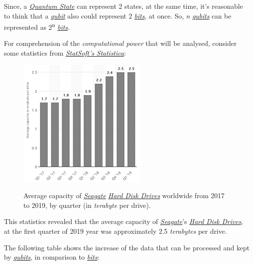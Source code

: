 \documentclass[conference]{IEEEtran}
\begin{document}
Since, a \href{https://en.wikipedia.org/wiki/Quantum_state}{\textit{Quantum State}} can represent 2 states, at the same time, it's reasonable to think that a \href{https://en.wikipedia.org/wiki/Qubit}{\textit{qubit}} also could represent 2 \href{https://en.wikipedia.org/wiki/Bit}{\textit{bits}}, at once. So, \textit{n \href{https://en.wikipedia.org/wiki/Qubit}{qubits}} can be represented as 2\textsuperscript{n} \href{https://en.wikipedia.org/wiki/Bit}{\textit{bits}}.

\vspace{4pt}

For comprehension of the \textit{computational power} that will be analysed, consider some statistics from \href{http://www.statsoft.com/Products/STATISTICA-Features}{\textit{StatSoft's Statistica}}:

\begin{figure}[htbp]
\centerline{\href{https://www.statista.com/statistics/795748/worldwide-seagate-average-hard-disk-drive-capacity/}{\includegraphics{imgs/fig-8.png}}}
\caption{Average capacity of \href{https://www.seagate.com/}{\textit{Seagate}} \href{https://en.wikipedia.org/wiki/Hard_disk_drive}{\textit{Hard Disk Drives}} worldwide from 2017 to 2019, by quarter (in \textit{terabyte} per drive).}
\label{fig}
\end{figure}

This statistics revealed that the average capacity of \href{https://www.seagate.com/}{\textit{Seagate}}'s \href{https://en.wikipedia.org/wiki/Hard_disk_drive}{\textit{Hard Disk Drives}}, at the first quarter of 2019 year was approximately 2.5 \textit{terabytes} per drive.

\vspace{4pt}

The following table shows the increase of the data that can be processed and kept by \href{https://en.wikipedia.org/wiki/Qubit}{\textit{qubits}}, in comparison to \href{https://en.wikipedia.org/wiki/Bit}{\textit{bits}}:
\end{document}
